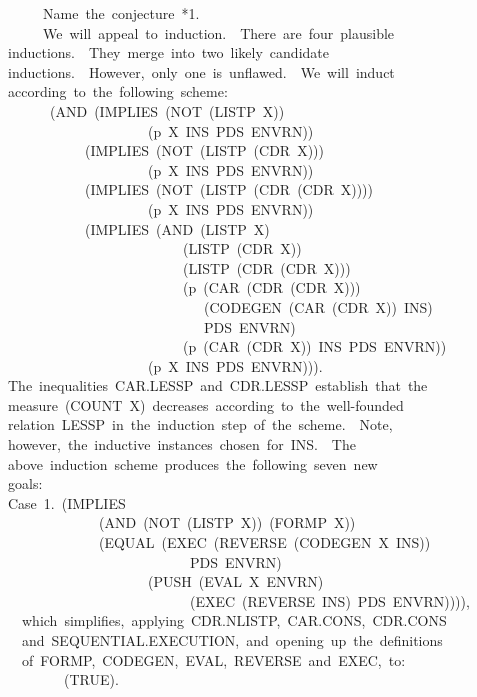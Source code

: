 \documentclass[11pt]{book}
\newenvironment{pubasis}{\begin{flushleft}\ttfamily\small}{\normalsize\rmfamily\end{flushleft}}
\begin{document}
\begin{pubasis}
~~~~~Name~the~conjecture~*1.\\

~~~~~We~will~appeal~to~induction.~~There~are~four~plausible\\
inductions.~~They~merge~into~two~likely~candidate\\
inductions.~~However,~only~one~is~unflawed.~~We~will~induct\\
according~to~the~following~scheme:\\
~~~~~~(AND~(IMPLIES~(NOT~(LISTP~X))\\
~~~~~~~~~~~~~~~~~~~~(p~X~INS~PDS~ENVRN))\\
~~~~~~~~~~~(IMPLIES~(NOT~(LISTP~(CDR~X)))\\
~~~~~~~~~~~~~~~~~~~~(p~X~INS~PDS~ENVRN))\\
~~~~~~~~~~~(IMPLIES~(NOT~(LISTP~(CDR~(CDR~X))))\\
~~~~~~~~~~~~~~~~~~~~(p~X~INS~PDS~ENVRN))\\
~~~~~~~~~~~(IMPLIES~(AND~(LISTP~X)\\
~~~~~~~~~~~~~~~~~~~~~~~~~(LISTP~(CDR~X))\\
~~~~~~~~~~~~~~~~~~~~~~~~~(LISTP~(CDR~(CDR~X)))\\
~~~~~~~~~~~~~~~~~~~~~~~~~(p~(CAR~(CDR~(CDR~X)))\\
~~~~~~~~~~~~~~~~~~~~~~~~~~~~(CODEGEN~(CAR~(CDR~X))~INS)\\
~~~~~~~~~~~~~~~~~~~~~~~~~~~~PDS~ENVRN)\\
~~~~~~~~~~~~~~~~~~~~~~~~~(p~(CAR~(CDR~X))~INS~PDS~ENVRN))\\
~~~~~~~~~~~~~~~~~~~~(p~X~INS~PDS~ENVRN))).\\
The~inequalities~CAR.LESSP~and~CDR.LESSP~establish~that~the\\
measure~(COUNT~X)~decreases~according~to~the~well-founded\\
relation~LESSP~in~the~induction~step~of~the~scheme.~~Note,\\
however,~the~inductive~instances~chosen~for~INS.~~The\\
above~induction~scheme~produces~the~following~seven~new\\
goals:\\

Case~1.~(IMPLIES\\
~~~~~~~~~~~~~(AND~(NOT~(LISTP~X))~(FORMP~X))\\
~~~~~~~~~~~~~(EQUAL~(EXEC~(REVERSE~(CODEGEN~X~INS))\\
~~~~~~~~~~~~~~~~~~~~~~~~~~PDS~ENVRN)\\
~~~~~~~~~~~~~~~~~~~~(PUSH~(EVAL~X~ENVRN)\\
~~~~~~~~~~~~~~~~~~~~~~~~~~(EXEC~(REVERSE~INS)~PDS~ENVRN)))),\\

~~which~simplifies,~applying~CDR.NLISTP,~CAR.CONS,~CDR.CONS\\
~~and~SEQUENTIAL.EXECUTION,~and~opening~up~the~definitions\\
~~of~FORMP,~CODEGEN,~EVAL,~REVERSE~and~EXEC,~to:\\

~~~~~~~~(TRUE).\\
\end{pubasis}
\end{document}
